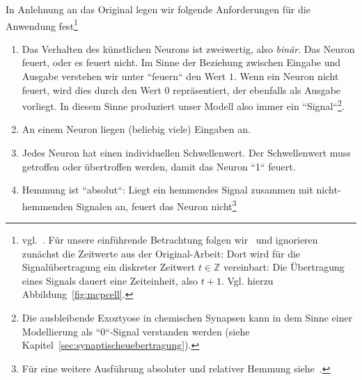 In Anlehnung an das Original legen wir folgende Anforderungen für die Anwendung fest\footnote{
    vgl.~\cite[26 f.]{Fau94}. Für unsere einführende Betrachtung folgen wir~\cite[33 f.]{Roj93} und ignorieren zunächst die Zeitwerte aus der Original-Arbeit: Dort wird für die Signalübertragung ein diskreter Zeitwert $t \in \mathbb{Z}$ vereinbart: Die Übertragung eines Signals dauert eine Zeiteinheit, also $t + 1$. Vgl. hierzu Abbildung~\ref{fig:mcpcell}.
}
\begin{enumerate}
    \item Das Verhalten des künstlichen Neurons ist zweiwertig, also \textit{binär}. Das Neuron feuert, oder es feuert nicht. Im Sinne der Beziehung zwischen Eingabe und Ausgabe verstehen wir unter ``feuern`` den Wert $1$. Wenn ein Neuron nicht feuert, wird dies durch den Wert $0$ repräsentiert, der ebenfalls als Ausgabe vorliegt. In diesem Sinne produziert unser Modell also immer ein ``Signal``\footnote{
        Die ausbleibende Exoztyose in chemischen Synapsen kann in dem Sinne einer Modellierung als ``0``-Signal verstanden werden (siehe Kapitel~\ref{sec:synaptischeuebertragung}).
    }.
    \item An einem Neuron liegen (beliebig viele) Eingaben an.
    \item Jedes Neuron hat einen individuellen Schwellenwert. Der Schwellenwert muss getroffen oder übertroffen werden, damit das Neuron ``1`` feuert.
    \item Hemmung ist ``absolut``: Liegt ein hemmendes Signal zusammen mit nicht-hemmenden Signalen an, feuert das Neuron nicht\footnote{
        Für eine weitere Ausführung absoluter und relativer Hemmung siehe~\cite[42 f.]{Roj93}.
    }
\end{enumerate}


